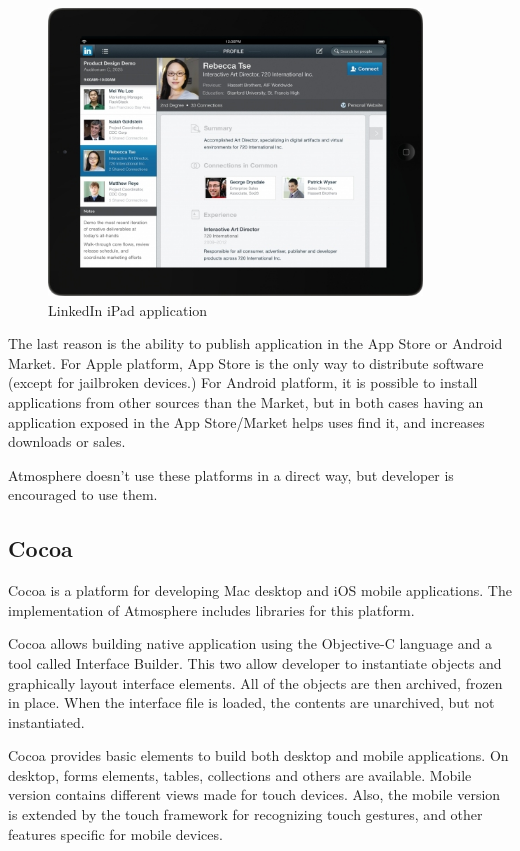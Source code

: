 \begin{figure}[htbp]
  \centering
    \includegraphics[height=3in]{figures/LinkedIn_iPad.jpg}
  \caption{LinkedIn iPad application}
  \label{fig:linkedin}
\end{figure}

The last reason is the ability to publish application in the App Store or Android Market. For Apple platform, App Store is the only way to distribute software (except for jailbroken devices.) For Android platform, it is possible to install applications from other sources than the Market, but in both cases having an application exposed in the App Store/Market helps uses find it, and increases downloads or sales.

Atmosphere doesn’t use these platforms in a direct way, but developer is encouraged to use them. 

\subsection{Cocoa}

Cocoa is a platform for developing Mac desktop and iOS mobile applications. The implementation of Atmosphere includes libraries for this platform.

Cocoa allows building native application using the Objective-C language and a tool called Interface Builder. This two allow developer to instantiate objects and graphically layout interface elements. All of the objects are then archived, frozen in place. When the interface file is loaded, the contents are unarchived, but not instantiated.

Cocoa provides basic elements to build both desktop and mobile applications. On desktop, forms elements, tables, collections and others are available. Mobile version contains different views made for touch devices. Also, the mobile version is extended by the touch framework for recognizing touch gestures, and other features specific for mobile devices.

